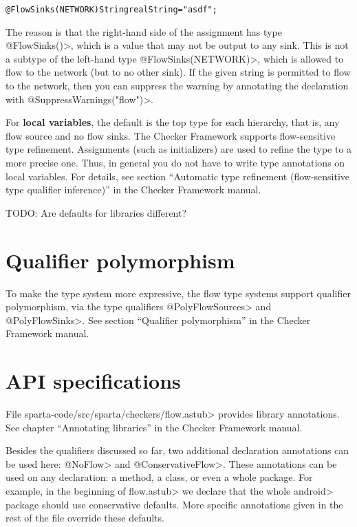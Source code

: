 \begin{alltt}
@FlowSinks(NETWORK) String realString = "asdf";
\end{alltt}

The reason is that the right-hand side of the assignment has type
\<@FlowSinks({})>, which is a value that may not be output to any sink.
This is not a subtype of the left-hand type \<@FlowSinks(NETWORK)>, which
is allowed to flow to the network (but to no other sink).  If the given
string is permitted to flow to the network, then you can suppress the
warning by annotating the declaration with \<@SuppressWarnings("flow")>.


For \textbf{local variables}, the default is the top type for each
hierarchy, that is, any flow source and no flow sinks.  The Checker
Framework supports flow-sensitive type refinement.  Assignments (such as
initializers) are used to refine the type to a more precise one.  Thus, in
general you do not have to write type annotations on local variables.  For
details, see section ``Automatic type refinement (flow-sensitive type
qualifier inference)'' in the Checker Framework manual.


TODO: Are defaults for libraries different?


\section{Qualifier polymorphism}

To make the type system more expressive, the flow type systems support
qualifier polymorphism, via the type qualifiers \<@PolyFlowSources> and
\<@PolyFlowSinks>.
See section ``Qualifier polymorphism'' in the Checker Framework manual.



\section{API specifications}

File \<sparta-code/src/sparta/checkers/flow.astub> provides library
annotations.  See chapter ``Annotating libraries'' in the Checker Framework
manual.

Besides the qualifiers discussed so far, two additional declaration
annotations can be used here: \<@NoFlow> and \<@ConservativeFlow>.
These annotations can be used on any declaration: a method, a class,
or even a whole package.
For example, in the beginning of \<flow.astub> we declare that the
whole \<android> package should use conservative defaults.
More specific annotations given in the rest of the file override these
defaults.

